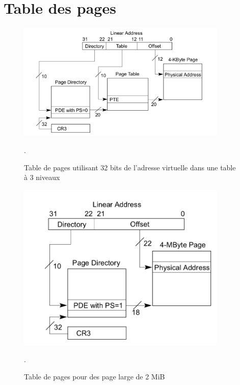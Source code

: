 \chapter{Table des pages}
\label{annexe:memory_page_table}



\begin{figure}[H]
    \center
    \includegraphics[width=10cm]{images/memory_page_table_32bits.png}
    \caption{\label{pic:memory_page_table_32bits} Table de pages utilisant 32 bits de l'adresse virtuelle dans une table à 3 niveaux \cite{intel64and}}.
\end{figure}

\begin{figure}
    \center
    \includegraphics[width=10cm]{images/memory_page_table_32bits_large.png}
    \caption{\label{pic:memory_page_table_32bits_large} Table de pages pour des page large de 2 MiB\cite{intel64and}}.
\end{figure}


